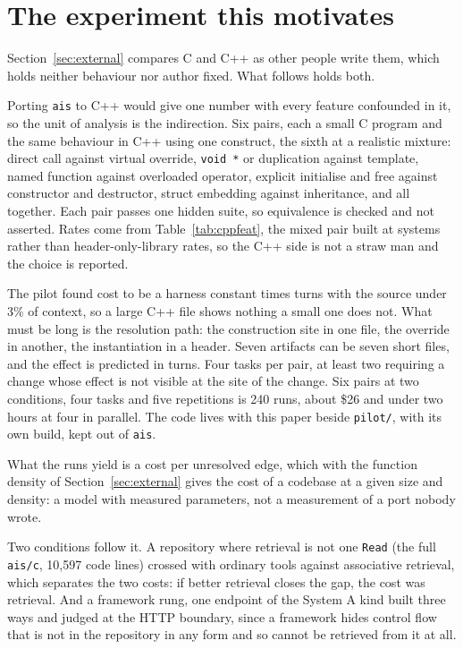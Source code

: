 \documentclass[11pt,a4paper]{article}
\begin{document}
\section{The experiment this motivates}
\label{sec:design}

Section~\ref{sec:external} compares C and C++ as other people write them, which holds neither behaviour nor author fixed. What follows holds both.

Porting \texttt{ais} to C++ would give one number with every feature confounded in it, so the unit of analysis is the indirection. Six pairs, each a small C program and the same behaviour in C++ using one construct, the sixth at a realistic mixture: direct call against virtual override, \texttt{void *} or duplication against template, named function against overloaded operator, explicit initialise and free against constructor and destructor, struct embedding against inheritance, and all together. Each pair passes one hidden suite, so equivalence is checked and not asserted. Rates come from Table~\ref{tab:cppfeat}, the mixed pair built at systems rather than header-only-library rates, so the C++ side is not a straw man and the choice is reported.

The pilot found cost to be a harness constant times turns with the source under 3\% of context, so a large C++ file shows nothing a small one does not. What must be long is the resolution path: the construction site in one file, the override in another, the instantiation in a header. Seven artifacts can be seven short files, and the effect is predicted in turns. Four tasks per pair, at least two requiring a change whose effect is not visible at the site of the change. Six pairs at two conditions, four tasks and five repetitions is 240 runs, about \$26 and under two hours at four in parallel. The code lives with this paper beside \texttt{pilot/}, with its own build, kept out of \texttt{ais}.

What the runs yield is a cost per unresolved edge, which with the function density of Section~\ref{sec:external} gives the cost of a codebase at a given size and density: a model with measured parameters, not a measurement of a port nobody wrote.

Two conditions follow it. A repository where retrieval is not one \texttt{Read} (the full \texttt{ais/c}, 10,597 code lines) crossed with ordinary tools against associative retrieval, which separates the two costs: if better retrieval closes the gap, the cost was retrieval. And a framework rung, one endpoint of the System A kind built three ways and judged at the HTTP boundary, since a framework hides control flow that is not in the repository in any form and so cannot be retrieved from it at all.
\end{document}
